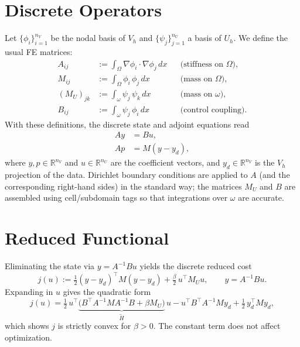 \documentclass[11pt,a4paper]{article}
\newcommand{\R}{\mathbb{R}}
\newcommand{\Om}{\Omega}
\newcommand{\om}{\omega}
\begin{document}
\section{Discrete Operators}\label{sec:operators}
Let $\{\phi_i\}_{i=1}^{n_V}$ be the nodal basis of $V_h$ and $\{\psi_j\}_{j=1}^{n_U}$ a basis of $U_h$. We define the usual FE matrices:
\begin{align}
  A_{ij} &:= \int_{\Om} \nabla\phi_i\cdot\nabla\phi_j\,dx && \text{(stiffness on $\Om$)}, \\
  M_{ij} &:= \int_{\Om} \phi_i\,\phi_j\,dx && \text{(mass on $\Om$)}, \\
  (M_U)_{jk} &:= \int_{\om} \psi_j\,\psi_k\,dx && \text{(mass on $\om$)}, \\
  B_{ij} &:= \int_{\om} \psi_j\,\phi_i\,dx && \text{(control coupling)}.
\end{align}
With these definitions, the discrete state and adjoint equations read
\begin{align}
  A y &= B u, \\
  A p &= M (y - y_d),
\end{align}
where $y,p\in\R^{n_V}$ and $u\in\R^{n_U}$ are the coefficient vectors, and $y_d\in\R^{n_V}$ is the $V_h$ projection of the data. Dirichlet boundary conditions are applied to $A$ (and the corresponding right-hand sides) in the standard way; the matrices $M_U$ and $B$ are assembled using cell/subdomain tags so that integrations over $\om$ are accurate.

\section{Reduced Functional}\label{sec:reduced}
Eliminating the state via $y = A^{-1} B u$ yields the discrete reduced cost
\begin{equation}
  j(u) := \tfrac12 (y - y_d)^\top M (y - y_d) + \tfrac{\beta}{2}\, u^\top M_U u,\qquad y = A^{-1} B u.
\end{equation}
Expanding in $u$ gives the quadratic form
\begin{equation}
  j(u) = \tfrac12\, u^\top\underbrace{\big( B^\top A^{-1} M A^{-1} B + \beta M_U \big)}_{\widetilde H}\,u
         - u^\top B^\top A^{-1} M y_d 
         + \tfrac12\, y_d^\top M y_d,
\end{equation}
which shows $j$ is strictly convex for $\beta>0$. The constant term does not affect optimization.
\end{document}
